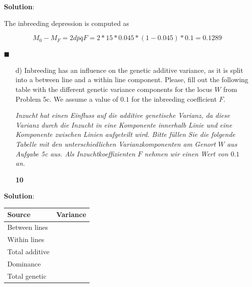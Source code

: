\documentclass[
]{article}
\newcommand{\points}[1]
{\begin{flushright}\textbf{#1}\end{flushright}}
\newcommand{\solstart}
{\vspace{3ex}\textbf{Solution}:}
\newcommand{\solend}
{\vspace{2ex}$\blacksquare$}
\begin{document}
\vspace{3ex}
\solstart

The inbreeding depression is computed as

\[M_0 - M_F = 2d\bar{p}\bar{q}F = 2 * 15 * 0.045 * (1 -  0.045) * 0.1 =  0.1289\]

\solend

\clearpage
\pagebreak

\begin{enumerate}
\item[d)] Inbreeding has an influence on the genetic additive variance, as it is split into a between line and a within line component. Please, fill out the following table with the different genetic variance components for the locus $W$ from Problem 5c. We assume a value of  $0.1$ for the inbreeding coefficient $F$. 

\textit{Inzucht hat einen Einfluss auf die additive genetische Varianz, da diese Varianz durch die Inzucht in eine Komponente innerhalb Linie und eine Komponente zwischen Linien aufgeteilt wird. Bitte füllen Sie die folgende Tabelle mit den unterschiedlichen Varianzkomponenten am Genort $W$ aus Aufgabe 5c aus. Als Inzuchtkoeffizienten $F$ nehmen wir einen Wert von $0.1$ an.}
\points{10}
\end{enumerate}

\vspace{3ex}

\textbf{Solution}:

\begin{table}[H]
\centering
\begin{tabular}{l>{\raggedright\arraybackslash}p{8cm}}
\toprule
Source & Variance\\
\midrule
\begingroup\fontsize{12}{14}\selectfont Between lines\endgroup & \begingroup\fontsize{12}{14}\selectfont \endgroup\\
\begingroup\fontsize{12}{14}\selectfont Within lines\endgroup & \begingroup\fontsize{12}{14}\selectfont \endgroup\\
\begingroup\fontsize{12}{14}\selectfont Total additive\endgroup & \begingroup\fontsize{12}{14}\selectfont \endgroup\\
\begingroup\fontsize{12}{14}\selectfont Dominance\endgroup & \begingroup\fontsize{12}{14}\selectfont \endgroup\\
\begingroup\fontsize{12}{14}\selectfont Total genetic\endgroup & \begingroup\fontsize{12}{14}\selectfont \endgroup\\
\bottomrule
\end{tabular}
\end{table}
\end{document}
